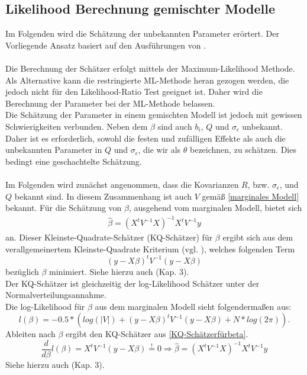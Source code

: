 \documentclass[%
thesis=student,%
coverpage=false,%
titlepage=false,%
headmarks=true, %
german,%
font=libertine, %
math=newpxtx, %
BCOR=5mm,%
coverBCOR=11mm%
]{tumbook}
\theoremstyle{break}
\begin{document}
\subsection{Likelihood Berechnung gemischter Modelle}
Im Folgenden wird die Schätzung der unbekannten Parameter erörtert. Der Vorliegende Ansatz basiert auf den Ausführungen von \cite{fahrmeir-2011-regression}.\\
\\
Die Berechnung der Schätzer erfolgt mittels der Maximum-Likelihood Methode. Als Alternative kann die restringierte ML-Methode heran gezogen werden, die jedoch nicht für den Likelihood-Ratio Test geeignet ist. Daher wird die Berechnung der Parameter bei der ML-Methode belassen.\\
Die Schätzung der Parameter in einem gemischten Modell ist jedoch mit gewissen Schwierigkeiten verbunden. Neben dem $\beta$ sind auch $b_i$, $Q$ und $\sigma_\epsilon$ unbekannt. Daher ist es erforderlich, sowohl die festen und zufälligen Effekte als auch die unbekannten Parameter in $Q$ und $\sigma_\epsilon$, die wir als $\theta$ bezeichnen, zu schätzen. Dies bedingt eine geschachtelte Schätzung.\\
\\
Im Folgenden wird zunächst angenommen, dass die Kovarianzen $R$, bzw. $\sigma_\epsilon$, und  $Q$ bekannt sind. In diesem Zusammenhang ist auch $V$ gemäß \ref{marginales Modell} bekannt. Für die Schätzung von $\beta$, ausgehend vom marginalen Modell, bietet sich 
\begin{align}
	\hat{\beta} = (X^t V^{-1}X)^{-1}X^t V^{-1}y \label{KQ-Schätzerfürbeta}
\end{align} an.
Dieser Kleinste-Quadrate-Schätzer (KQ-Schätzer) für $\beta$ ergibt sich aus dem verallgemeinertem Kleinste-Quadrate Kriterium (vgl. \cite{KQ-Schätzer}), welches folgenden Term
$$(y-X\beta)^tV^{-1}(y-X\beta)$$ 
bezüglich $\beta$ minimiert. Siehe hierzu auch \cite{fahrmeir-2011-regression} (Kap. 3).\\
Der KQ-Schätzer ist gleichzeitig der log-Likelihood Schätzer unter der Normalverteilungsannahme.\\
Die log-Likelihood für $\beta$ aus dem marginalen Modell sieht folgendermaßen aus:
$$ l(\beta) =  -0.5 * (log(|V|)+ (y-X\beta)^t V^{-1}(y-X\beta) + N * log(2\pi)).$$ 
Ableiten nach $\beta$ ergibt den KQ-Schätzer aus \ref{KQ-Schätzerfürbeta}.
$$\frac{d}{d\beta}l(\beta) = X^t V^{-1} (y-X\beta) \stackrel{!}{=} 0  \Rightarrow \hat{\beta} = (X^t V^{-1}X)^{-1}X^t V^{-1}y$$
Siehe hierzu auch \cite{fahrmeir-2011-regression} (Kap. 3).\\
\end{document}
